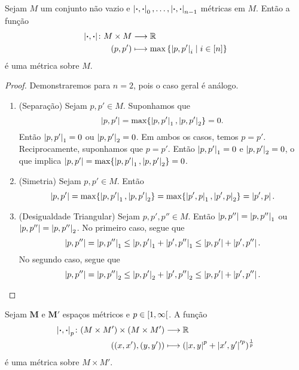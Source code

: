 \begin{proposition}
Sejam $M$ um conjunto não vazio e $\left\vert{\bm{\cdot}},{\bm{\cdot}}\right\vert_0, \ldots,\left\vert{\bm{\cdot}},{\bm{\cdot}}\right\vert_{n-1}$ métricas em $M$. Então a função
	\begin{align*}
	{\left\vert{\bm{\cdot}},{\bm{\cdot}}\right\vert}\colon {M \times M} &\longrightarrow {\mathbb{R}} \\{(p,p')} &\longmapsto \max\left\{ \left\vert{p},{p'}\right\vert_i \;\middle\vert\; i \in [n] \right\}
	\end{align*}
é uma métrica sobre $M$.
\end{proposition}
\begin{proof}
Demonstraremos para $n=2$, pois o caso geral é análogo.
	\begin{enumerate}
	\item (Separação) Sejam $p,p' \in M$. Suponhamos que
	\begin{equation*}
	\left\vert{p},{p'}\right\vert=\max\{\left\vert{p},{p'}\right\vert_1,\left\vert{p},{p'}\right\vert_2\}=0.
	\end{equation*}
Então $\left\vert{p},{p'}\right\vert_1=0$ ou $\left\vert{p},{p'}\right\vert_2=0$. Em ambos os casos, temos $p=p'$. Reciprocamente, suponhamos que $p=p'$. Então $\left\vert{p},{p'}\right\vert_1=0$ e $\left\vert{p},{p'}\right\vert_2=0$, o que implica $\left\vert{p},{p'}\right\vert=\max\{\left\vert{p},{p'}\right\vert_1,\left\vert{p},{p'}\right\vert_2\}=0$.

	\item (Simetria) Sejam $p,p' \in M$. Então
	\begin{equation*}
	\left\vert{p},{p'}\right\vert = \max\{\left\vert{p},{p'}\right\vert_1,\left\vert{p},{p'}\right\vert_2\} = \max\{\left\vert{p'},{p}\right\vert_1,\left\vert{p'},{p}\right\vert_2\} = \left\vert{p'},{p}\right\vert.
	\end{equation*}

	\item (Desigualdade Triangular) Sejam $p,p',p'' \in M$. Então $\left\vert{p},{p''}\right\vert=\left\vert{p},{p''}\right\vert_1$ ou $\left\vert{p},{p''}\right\vert=\left\vert{p},{p''}\right\vert_2$. No primeiro caso, segue que
	\begin{equation*}
	\left\vert{p},{p''}\right\vert = \left\vert{p},{p''}\right\vert_1 \leq \left\vert{p},{p'}\right\vert_1 + \left\vert{p'},{p''}\right\vert_1 \leq \left\vert{p},{p'}\right\vert + \left\vert{p'},{p''}\right\vert.
	\end{equation*}
	No segundo caso, segue que
	\begin{equation*}
	\left\vert{p},{p''}\right\vert = \left\vert{p},{p''}\right\vert_2 \leq \left\vert{p},{p'}\right\vert_2 + \left\vert{p'},{p''}\right\vert_2 \leq \left\vert{p},{p'}\right\vert + \left\vert{p'},{p''}\right\vert. \qedhere
	\end{equation*}
	\end{enumerate}
\end{proof}

\begin{exercise}[Métricas $p$]
Sejam $\bm M$ e $\bm M'$ espaços métricos e $p \in \left[1,\allowbreak \infty\right[$.
A função
	\begin{align*}
	{\left\vert{\bm{\cdot}},{\bm{\cdot}}\right\vert_p}\colon {(M \times M') \times (M \times M')} &\longrightarrow {\mathbb{R}} \\{((x,x'),(y,y'))} &\longmapsto (\left\vert{x},{y}\right\vert^p + \left\vert{x'},{y'}\right\vert'^p)^{\frac{1}{p}}
	\end{align*}
é uma métrica sobre $M \times M'$.
\end{exercise}

